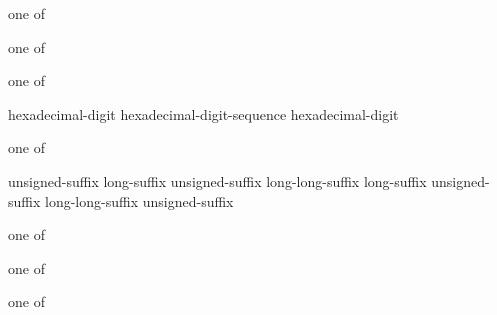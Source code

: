 \begin{bnf}
 \textnormal{one of}\br
\end{bnf}

\begin{bnf}
 \textnormal{one of}\br
\end{bnf}

\begin{bnf}
 \textnormal{one of}\br
\end{bnf}

\begin{bnf}
\br
    hexadecimal-digit\br
    hexadecimal-digit-sequence \opt hexadecimal-digit
\end{bnf}

\begin{bnf}
 \textnormal{one of}\br
    \br
    \br
\end{bnf}

\begin{bnf}
\br
    unsigned-suffix long-suffix\opt \br
    unsigned-suffix long-long-suffix\opt \br
    long-suffix unsigned-suffix\opt \br
    long-long-suffix unsigned-suffix\opt
\end{bnf}

\begin{bnf}
 \textnormal{one of}\br
\end{bnf}

\begin{bnf}
 \textnormal{one of}\br
\end{bnf}

\begin{bnf}
 \textnormal{one of}\br
\end{bnf}

